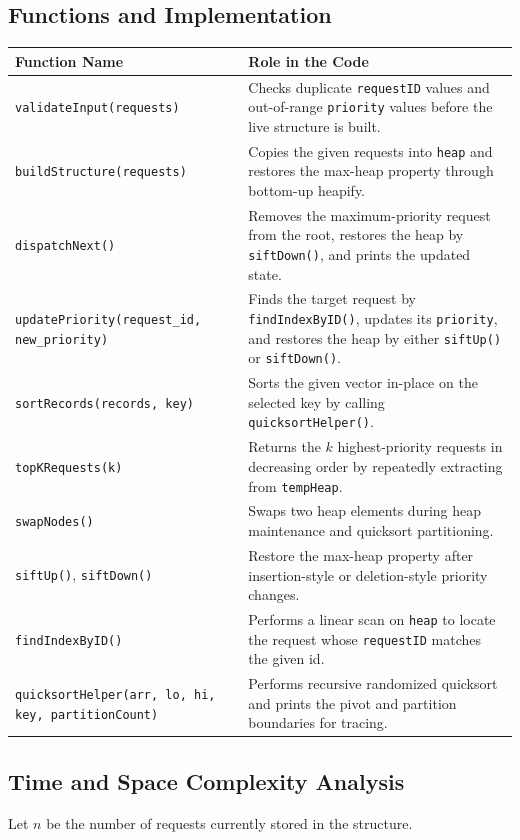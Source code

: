 \documentclass[10pt,a4paper]{article}
\begin{document}
\subsection{Functions and Implementation}
\begin{table}[H]
\centering
\scriptsize
\begin{tabularx}{\textwidth}{|p{4.35cm}|X|}
\hline
\textbf{Function Name} & \textbf{Role in the Code} \\
\hline
\texttt{validateInput(requests)} & Checks duplicate \texttt{requestID} values and out-of-range \texttt{priority} values before the live structure is built. \\
\hline
\texttt{buildStructure(requests)} & Copies the given requests into \texttt{heap} and restores the max-heap property through bottom-up heapify. \\
\hline
\texttt{dispatchNext()} & Removes the maximum-priority request from the root, restores the heap by \texttt{siftDown()}, and prints the updated state. \\
\hline
\texttt{updatePriority(request\_id, new\_priority)} & Finds the target request by \texttt{findIndexByID()}, updates its \texttt{priority}, and restores the heap by either \texttt{siftUp()} or \texttt{siftDown()}. \\
\hline
\texttt{sortRecords(records, key)} & Sorts the given vector in-place on the selected key by calling \texttt{quicksortHelper()}. \\
\hline
\texttt{topKRequests(k)} & Returns the \(k\) highest-priority requests in decreasing order by repeatedly extracting from \texttt{tempHeap}. \\
\hline
\texttt{swapNodes()} & Swaps two heap elements during heap maintenance and quicksort partitioning. \\
\hline
\texttt{siftUp()}, \texttt{siftDown()} & Restore the max-heap property after insertion-style or deletion-style priority changes. \\
\hline
\texttt{findIndexByID()} & Performs a linear scan on \texttt{heap} to locate the request whose \texttt{requestID} matches the given id. \\
\hline
\texttt{quicksortHelper(arr, lo, hi, key, partitionCount)} & Performs recursive randomized quicksort and prints the pivot and partition boundaries for tracing. \\
\hline
\end{tabularx}
\end{table}

\subsection{Time and Space Complexity Analysis}
Let \(n\) be the number of requests currently stored in the structure.
\end{document}
